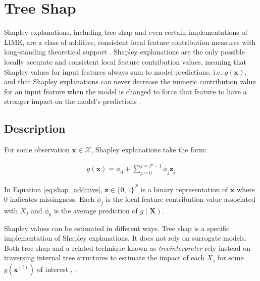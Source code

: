 \documentclass[11pt]{asaproc}
\begin{document}
\section{Tree Shap} \label{sec:shap}

Shapley explanations, including tree shap and even certain implementations of LIME, are a class of additive, consistent local feature contribution measures with long-standing theoretical support \cite{shapley}. Shapley explanations are the only possible locally accurate and consistent local feature contribution values, meaning that Shapley values for input features always sum to model predictions, i.e. $g(\mathbf{x})$, and that Shapley explanations can never decrease the numeric contribution value for an input feature when the model is changed to force that feature to have a stronger impact on the model’s predictions \cite{shapley}. 

\vspace{10pt}

\subsection{Description}

For some observation $\mathbf{x} \in \mathcal{X}$, Shapley explanations take the form:

\begin{equation}
\label{eq:shap_additive}
\begin{aligned}
g(\mathbf{x}) = \phi_0 + \sum_{j=0}^{j=\mathcal{P} - 1} \phi_j \mathbf{z}_j
\end{aligned}
\end{equation}

\noindent In Equation \ref{eq:shap_additive}, $\mathbf{z} \in \{0,1\}^\mathcal{P}$ is a binary representation of $\mathbf{x}$ where 0 indicates missingness. Each $\phi_j$ is the local feature contribution value associated with $X_j$ and $\phi_0$ is the average prediction of $g(\mathbf{X})$. 

Shapley values can be estimated in different ways. Tree shap is a specific implementation of Shapley explanations. It does not rely on surrogate models. Both tree shap and a related technique known as \textit{treeinterpreter} rely instead on traversing internal tree structures to estimate the impact of each $X_j$ for some $g(\mathbf{x}^{(i)})$ of interest \cite{tree_shap}, \cite{treeinterpreter}.
\end{document}
